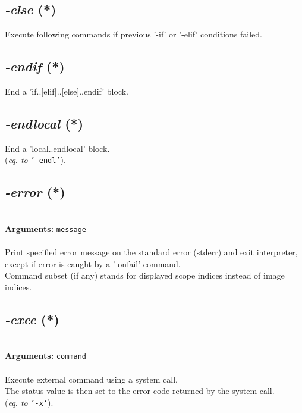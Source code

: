 \documentclass[a4paper,11pt,twoside]{book}
\begin{document}
\subsection{\emph{-else} (*)}\vspace*{-0.5em}
Execute following commands if previous '-if' or '-elif' conditions failed.


\subsection{\emph{-endif} (*)}\vspace*{-0.5em}
End a 'if..[elif]..[else]..endif' block.


\subsection{\emph{-endlocal} (*)}\vspace*{-0.5em}
End a 'local..endlocal' block.
~\\(\emph{eq. to} {\small \texttt{'-endl'}}).


\subsection{\emph{-error} (*)}\vspace*{-0.5em}
~\\\textbf{Arguments: } 
{\small \texttt{message}}\\~\\
Print specified error message on the standard error (stderr) and exit interpreter, except
if error is caught by a '-onfail' command.
~\\Command subset (if any) stands for displayed scope indices instead of image indices.


\subsection{\emph{-exec} (*)}\vspace*{-0.5em}
~\\\textbf{Arguments: } 
{\small \texttt{command}}\\~\\
Execute external command using a system call.
~\\The status value is then set to the error code returned by the system call.
~\\(\emph{eq. to} {\small \texttt{'-x'}}).
\end{document}
